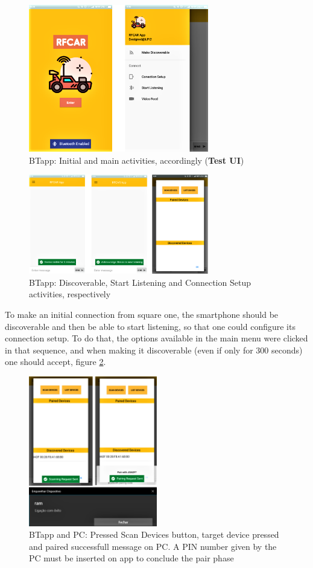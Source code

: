 %
\begin{figure}[!ht]
\centering
\includegraphics[width=0.7\textwidth]{img/bt_intro_main.png}
\caption{\label{fig:bt_intro_main}BTapp: Initial and main activities, accordingly (\textbf{Test UI})}
\end{figure}
%
\begin{figure}[!ht]
\centering
\includegraphics[width=0.7\textwidth]{img/bt_disc_list_setup.png}
\caption{\label{fig:bt_disc_list_setup}BTapp: Discoverable, Start Listening and Connection Setup activities, respectively}
\end{figure}
%
To make an initial connection from square one, the smartphone should be discoverable and then be able to start listening, so that one could configure its connection setup. To do that, the options available in the main menu were clicked in that sequence, and when making it discoverable (even if only for 300 seconds) one should accept, figure \ref{fig:bt_disc_list_setup}.
%
\begin{figure}[!ht]
\centering
\includegraphics[width=0.5\textwidth]{img/bt_con_scan_pair_suc.png}
\caption{\label{fig:bt_con_scan_pair_suc}BTapp and PC: Pressed Scan Devices button, target device pressed and paired successfull message on PC. A PIN number given by the PC must be inserted on app to conclude the pair phase}
\end{figure}
